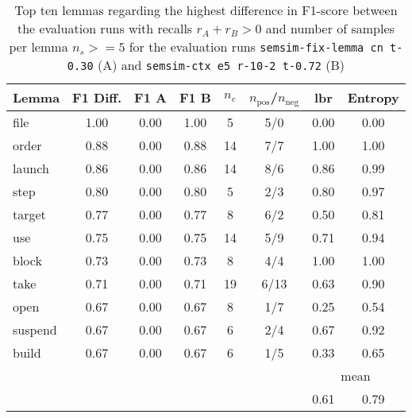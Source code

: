 \documentclass[11pt, numbers=noenddot]{scrreprt}
\begin{document}
\begin{table}[p]
\centering
\begin{tabular}{lccccccc}
\toprule
Lemma      & F1 Diff. & F1 A & F1 B & \(n_e\) & \(n_\text{pos}\)/\(n_\text{neg}\) & \gls{lbr} & Entropy \\
\midrule
file       & 1.00      & 0.00           & 1.00           & 5               & 5/0     & 0.00 & 0.00 \\
order      & 0.88      & 0.00           & 0.88           & 14              & 7/7     & 1.00 & 1.00 \\
launch     & 0.86      & 0.00           & 0.86           & 14              & 8/6     & 0.86 & 0.99 \\
step       & 0.80      & 0.00           & 0.80           & 5               & 2/3     & 0.80 & 0.97 \\
target     & 0.77      & 0.00           & 0.77           & 8               & 6/2     & 0.50 & 0.81 \\
use        & 0.75      & 0.00           & 0.75           & 14              & 5/9     & 0.71 & 0.94 \\
block      & 0.73      & 0.00           & 0.73           & 8               & 4/4     & 1.00 & 1.00 \\
take       & 0.71      & 0.00           & 0.71           & 19              & 6/13    & 0.63 & 0.90 \\
open       & 0.67      & 0.00           & 0.67           & 8               & 1/7     & 0.25 & 0.54 \\
suspend    & 0.67      & 0.00           & 0.67           & 6               & 2/4     & 0.67 & 0.92 \\
build      & 0.67      & 0.00           & 0.67           & 6               & 1/5     & 0.33 & 0.65 \\
\cmidrule{7-8}
\multicolumn{6}{l}{} & \multicolumn{2}{c}{mean} \\
\multicolumn{6}{l}{} & 0.61 & 0.79 \\
\bottomrule
\end{tabular}
\caption{Top ten lemmas regarding the highest difference in F1-score between the evaluation runs with recalls \(r_A + r_B > 0\) and number of samples per lemma \(n_s >= 5\) for the evaluation runs \texttt{semsim-fix-lemma cn t-0.30} (A) and \texttt{semsim-ctx e5 r-10-2 t-0.72} (B)}
\label{tab:predicate-lemma-highest-f1}
\end{table}
\end{document}
